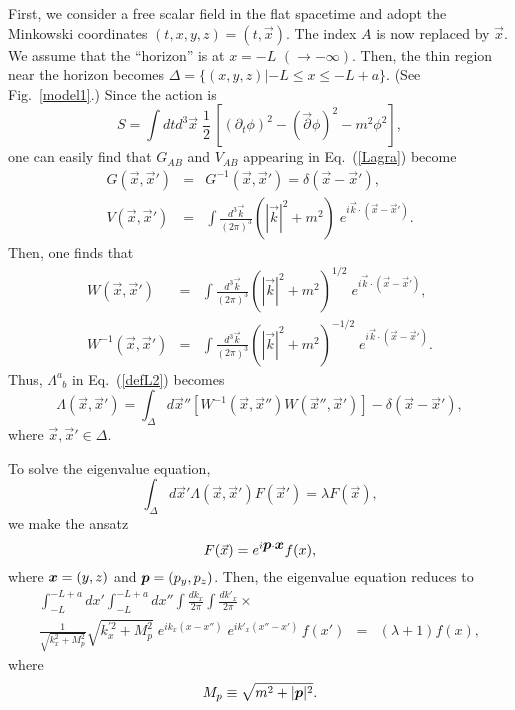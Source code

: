 \documentclass[12pt,epsf]{article}
\def\sp{\phantom{a}}
\def\bmi#1{\mbox{\boldmath $#1$}}
\begin{document}
First, we consider a free scalar field in the flat spacetime and
adopt the Minkowski coordinates $(t,x,y,z)=(t,\vec{x})$.
The index $A$ is now replaced by $\vec{x}$.
We assume that the ``horizon'' is at $x=-L$ $(\to-\infty)$.
Then, the thin region near the horizon becomes
$\Delta=\{(x,y,z) | -L\le x \le -L+a \}$.
(See Fig.~\ref{model1}.)
Since the action is
\begin{equation}
  S=\int dtd^3\vec{x}\; \frac{1}{2} \,
  \left[ (\partial_t\phi)^2-
         (\vec{\partial}\phi)^2-m^2\phi^2 \right],
\end{equation}
one can easily find that $G_{AB}$ and $V_{AB}$ appearing
in Eq.~(\ref{Lagra}) become~\cite{BKLS86}
\begin{eqnarray}
  G(\vec{x},\vec{x}')&=& G^{-1}(\vec{x},\vec{x}')=
                          \delta(\vec{x}-\vec{x}'), \\
  V(\vec{x},\vec{x}')&=&\int\frac{d^3\vec{k}}{(2\pi)^3}
    \left(|\vec{k}|^2+m^2\right)
   \;e^{i\vec{k}\cdot (\vec{x}-\vec{x}')}.
\end{eqnarray}
Then, one finds that
\begin{eqnarray}
  W(\vec{x},\vec{x}') &=& \int\frac{d^3\vec{k}}{(2\pi)^3}
    \left(|\vec{k}|^2+m^2\right)^{1/2}
   \;e^{i\vec{k}\cdot (\vec{x}-\vec{x}')}, \\
  W^{-1}(\vec{x},\vec{x}')&=&\int\frac{d^3\vec{k}}{(2\pi)^3}
    \left(|\vec{k}|^2+m^2\right)^{-1/2}
   \;e^{i\vec{k}\cdot (\vec{x}-\vec{x}')}.
\end{eqnarray}
Thus, $\Lambda^a_{\sp b}$ in Eq.~(\ref{defL2}) becomes
\begin{equation}
  \Lambda(\vec{x},\vec{x}') = 
   \int_\Delta d\vec{x}'' \left[ W^{-1}(\vec{x},\vec{x}'')
    W(\vec{x}'',\vec{x}')  \right]
  -\delta(\vec{x}-\vec{x}'),
\end{equation}
where $\vec{x},\vec{x}'\in \Delta$.

To solve the eigenvalue equation,
\begin{equation}
  \int_\Delta d\vec{x}' \Lambda(\vec{x},\vec{x}') F(\vec{x}')
   =\lambda  F(\vec{x}),
\end{equation}
we make the ansatz
\begin{equation}
  F(\vec{x}) = e^{i\bmi{p}\cdot\bmi{x}} f(x),
\end{equation}
where $\bmi{x}=(y,z)$ and $\bmi{p}=(p_y,p_z)$.
Then, the eigenvalue equation reduces to
\begin{eqnarray}
  \int^{-L+a}_{-L} dx' \int^{-L+a}_{-L} dx''
  \int \frac{dk_x}{2\pi}\int \frac{dk'_x}{2\pi}
   \times \qquad\qquad\quad
   & & \nonumber \\
  \frac{1}{\sqrt{k_x^2+M_p^2}}\sqrt{k_x^{'2}+M_p^2}
  \;e^{ik_x(x-x'')}\;e^{ik'_x(x''-x')}\, f(x')
   &=&  (\lambda+1) f(x),
\end{eqnarray}
where
\begin{equation}
 M_p  \equiv \sqrt{m^2+|\bmi{p}|^2}.
\end{equation}
\end{document}
